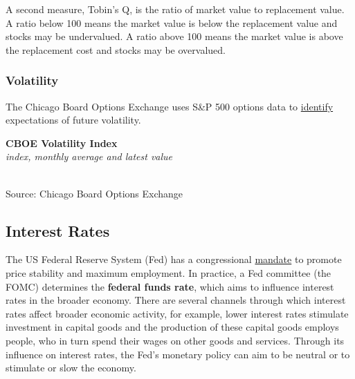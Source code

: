 \documentclass{report}
\makeatletter
\newcommand{\tbllink}[1]{\href{https://raw.githubusercontent.com/bdecon/US-chartbook/master/chartbook/data/#1}{\faTable}}
\newcommand*\short[1]{\expandafter\@gobbletwo\number\numexpr#1\relax}
\newcommand{\dateaxisticks}{
		date coordinates in=x, axis line style={draw=none},
		xmax={2023-11-01},
		max space between ticks=40,	    
		xtick={{1990-01-01}, {1992-01-01}, {1994-01-01}, 
			{1996-01-01}, {1998-01-01}, {2000-01-01}, 
			{2002-01-01}, {2004-01-01}, {2006-01-01},
			{2008-01-01}, {2010-01-01}, {2012-01-01}, {2014-01-01},
		    {2016-01-01}, {2018-01-01}, {2020-01-01}, {2022-01-01}, 
		    {2024-01-01}, {2026-01-01}},
		minor xtick={{1989-01-01}, {1991-01-01}, {1993-01-01},
			{1995-01-01}, {1997-01-01}, {1999-01-01}, 
			{2001-01-01}, {2003-01-01}, {2005-01-01}, {2007-01-01},
		    {2009-01-01}, {2011-01-01}, {2013-01-01}, {2015-01-01},
		    {2017-01-01}, {2019-01-01}, {2021-01-01}, {2023-01-01}, 
		    {2025-01-01}, {2027-01-01}},
		enlarge y limits={0.06}, enlarge x limits={0.01},
		}
\newcommand{\bbar}[2]{extra #1 ticks = {{#2}}, extra #1 tick labels = ,
		extra #1 tick style = {grid=major, grid style={thick, black!25}},}
\newcommand{\stdline}[4]{\addplot[very thick, no markers, color=#1] 
		table [x=#2, y=#3, col sep=comma] {#4};	}
\newcommand{\rbars}{
		\fill[color=black!10] (axis cs:{1990-07-01},\pgfkeysvalueof{/pgfplots/ymin}) rectangle 
			(axis cs:{1991-03-01}, \pgfkeysvalueof{/pgfplots/ymax});
		\fill[color=black!10] (axis cs:{2007-12-01},\pgfkeysvalueof{/pgfplots/ymin}) rectangle 
			(axis cs:{2009-07-01}, \pgfkeysvalueof{/pgfplots/ymax});
		\fill[color=black!10] (axis cs:{2001-03-01},\pgfkeysvalueof{/pgfplots/ymin}) rectangle 
			(axis cs:{2001-11-01}, \pgfkeysvalueof{/pgfplots/ymax});
		\fill[color=black!10] (axis cs:{2020-02-01},\pgfkeysvalueof{/pgfplots/ymin}) rectangle 
			(axis cs:{2020-05-01}, \pgfkeysvalueof{/pgfplots/ymax});}
\makeatother
\begin{document}
{\begin{minipage}{0.76\textwidth}
\small A second measure, Tobin's Q, is the ratio of market value to replacement value. A ratio below 100 means the market value is below the replacement value and stocks may be undervalued. A ratio above 100 means the market value is above the replacement cost and stocks may be overvalued.  
\vspace{3mm}

\subsubsection*{Volatility}  
\small The Chicago Board Options Exchange uses S\&P 500 options data to \href{http://www.cboe.com/vix}{identify} expectations of future volatility. 
\vspace{1mm}

\normalsize \textbf{CBOE Volatility Index}\\
\footnotesize{\textit{index, monthly average and latest value}}\\
\hspace*{-1mm} \\
\footnotesize{Source: Chicago Board Options Exchange} \hfill \tbllink{vix.csv}
\end{minipage}
\newpage
\begin{minipage}{0.76\textwidth}    
\subsection*{Interest Rates}
\hypertarget{capint}{\label{capint}}
\small The US Federal Reserve System (Fed) has a congressional \href{https://www.federalreserve.gov/faqs/money_12848.htm}{mandate} to promote price stability and maximum employment. In practice, a Fed committee (the FOMC) determines the \textbf{federal funds rate}, which aims to influence interest rates in the broader economy. There are several channels through which interest rates affect broader economic activity, for example, lower interest rates stimulate investment in capital goods and the production of these capital goods employs people, who in turn spend their wages on other goods and services. Through its influence on interest rates, the Fed's monetary policy can aim to be neutral or to stimulate or slow the economy.


\end{minipage}}
\end{document}

